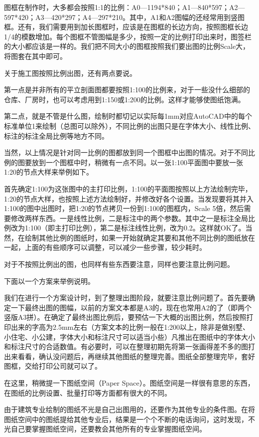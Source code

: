图框在制作时，大多都会按照1:1的比例：A0—1194*840；A1—840*597；A2—597*420；A3—420*297；A4—297*210。其中，A1和A2图幅的还经常用到竖图框。还有，我们需要用到加长图框时，应该是在图框的长边方向，按照图框长边1/4的模数增加。每个图框不管图幅是多少，按照一定的比例打印出来时，图签栏的大小都应该是一样的。我们把不同大小的图框按照我们要出图的比例Scale大，将图套在其中即可。 

关于施工图按照比例出图，还有两点要说。

第一点是并非所有的平立剖面图都要按照1:100的比例来，对于一些没什么细部的仓库、厂房时，也可以考虑用到1:150或1:200的比例。这样才能够使图纸饱满。 

第二点，就是不管是什么图，绘制时都切记以实际每1mm对应AutoCAD中的每个标准单位1来绘制（总图可以除外），不同比例的出图只是在字体大小、线性比例、标注的标注全局比例等地方不同。 

当然，以上情况是针对同一比例的图都放到同一个图框中出图的情况。对于不同比例的图要放到一个图框中时，稍微有一点不同。以一张1:100平面图中要放一张1:20的节点大样来举例如下。 

首先确定1:100为这张图中的主打印比例，1:100的平面图按照以上方法绘制完毕，1:20的节点大样，也按照上述方法绘制好，并修改好各个设置。当发现要将其并入1:100的图中出图时，把1:20的节点拷贝一份到1:100的图框内，Scale 5倍，然后需要修改两样东西。一是线性比例，二是标注中的两个参数。其中之一是标注全局比例改为1:100（即主打印比例），第二是标注线性比例，改为0.2。这样就OK了。当然，在绘制其他比例的图纸时，如果一开始就确定其要和其他不同比例的图纸放在一起，上面的有些顺序可以调整，可以减少一些步骤，较少耗时。 

对于不按照比例出的图，也同样有些东西要注意，同样也要注意比例问题。 

下面以一个方案来举例说明。 

我们在进行一个方案设计时，到了整理出图阶段，就要注意比例问题了。首先要确定一下最终出图的图幅，以前的方案文本都是A3的，现在也常用A2的了（即两个竖版A3拼）。在确定了最终出图比例后，要预估一下大概的出图比例，然后按照打印出来的字高为2.5mm左右（方案文本的比例一般在1:200以上，除非是做别墅、小住宅、小公建，字体大小和标注尺寸可以适当小些）凡推出在图纸中的字体大小和标注尺寸的合适数值。有必要时，可以在整理初期先将第一张画得差不多的图打出来看看，确认没问题后，再继续其他图纸的整理完善。图纸全部整理完毕，套好图框，交给打印公司就可以了。

在这里，稍微提一下图纸空间（Paper Space）。图纸空间是一样很有意思的东西，在图纸的比例设置、批量打印等方面都有很大的不同。


由于建筑专业绘制的图纸不光是自己出图用的，还要作为其他专业的条件图。在将图纸空间中的图纸提给其他专业后，结果是一个个不断的电话询问，这时发现，不光自己要掌握图纸空间，还要教会其他所有的专业掌握图纸空间。


